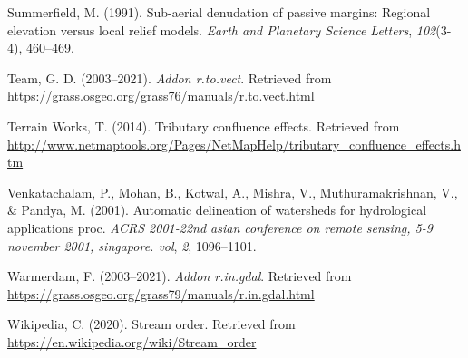 \documentclass[11pt,]{article}
\begin{document}
\hypertarget{ref-summerfield1991sub}{}
Summerfield, M. (1991). Sub-aerial denudation of passive margins:
Regional elevation versus local relief models. \emph{Earth and Planetary
Science Letters}, \emph{102}(3-4), 460--469.

\hypertarget{ref-tovect}{}
Team, G. D. (2003--2021). \emph{Addon r.to.vect}. Retrieved from
\url{https://grass.osgeo.org/grass76/manuals/r.to.vect.html}

\hypertarget{ref-tributary}{}
Terrain Works, T. (2014). Tributary confluence effects. Retrieved from
\url{http://www.netmaptools.org/Pages/NetMapHelp/tributary_confluence_effects.htm}

\hypertarget{ref-venkatachalam2001automatic}{}
Venkatachalam, P., Mohan, B., Kotwal, A., Mishra, V., Muthuramakrishnan,
V., \& Pandya, M. (2001). Automatic delineation of watersheds for
hydrological applications proc. \emph{ACRS 2001-22nd asian conference on
remote sensing, 5-9 november 2001, singapore. vol}, \emph{2},
1096--1101.

\hypertarget{ref-ringdal}{}
Warmerdam, F. (2003--2021). \emph{Addon r.in.gdal}. Retrieved from
\url{https://grass.osgeo.org/grass79/manuals/r.in.gdal.html}

\hypertarget{ref-wikipedia2020stream}{}
Wikipedia, C. (2020). Stream order. Retrieved from
\url{https://en.wikipedia.org/wiki/Stream_order}




\newpage
\singlespacing 
\end{document}
